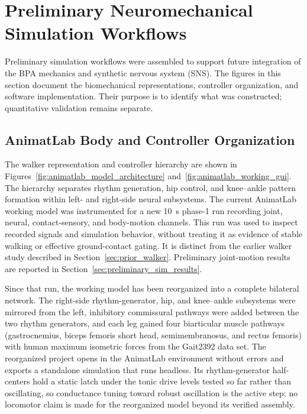 \section{Preliminary Neuromechanical Simulation Workflows}\label{sec:preliminary_sim_methods}

Preliminary simulation workflows were assembled to support future integration of the BPA mechanics and synthetic nervous system (SNS). The figures in this section document the biomechanical representations, controller organization, and software implementation. Their purpose is to identify what was constructed; quantitative validation remains separate.

\subsection{AnimatLab Body and Controller Organization}

The walker representation and controller hierarchy are shown in Figures~\ref{fig:animatlab_model_architecture} and~\ref{fig:animatlab_working_gui}. The hierarchy separates rhythm generation, hip control, and knee--ankle pattern formation within left- and right-side neural subsystems. The current AnimatLab working model was instrumented for a new \qty{10}{\second} phase-1 run recording joint, neural, contact-sensory, and body-motion channels. This run was used to inspect recorded signals and simulation behavior, without treating it as evidence of stable walking or effective ground-contact gating. It is distinct from the earlier walker study described in Section~\ref{sec:prior_walker}. Preliminary joint-motion results are reported in Section~\ref{sec:preliminary_sim_results}.

Since that run, the working model has been reorganized into a complete bilateral network. The right-side rhythm-generator, hip, and knee--ankle subsystems were mirrored from the left, inhibitory commissural pathways were added between the two rhythm generators, and each leg gained four biarticular muscle pathways (gastrocnemius, biceps femoris short head, semimembranosus, and rectus femoris) with human maximum isometric forces from the Gait2392 data set. The reorganized project opens in the AnimatLab environment without errors and exports a standalone simulation that runs headless. Its rhythm-generator half-centers hold a static latch under the tonic drive levels tested so far rather than oscillating, so conductance tuning toward robust oscillation is the active step; no locomotor claim is made for the reorganized model beyond its verified assembly.

